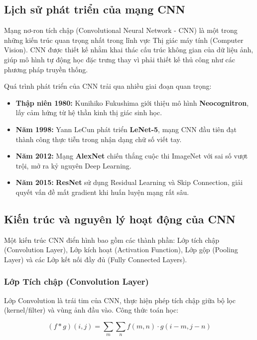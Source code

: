 \subsection{Lịch sử phát triển của mạng CNN}
Mạng nơ-ron tích chập (Convolutional Neural Network - CNN) là một trong những kiến trúc quan trọng nhất trong lĩnh vực Thị giác máy tính (Computer Vision). CNN được thiết kế nhằm khai thác cấu trúc không gian của dữ liệu ảnh, giúp mô hình tự động học đặc trưng thay vì phải thiết kế thủ công như các phương pháp truyền thống.

Quá trình phát triển của CNN trải qua nhiều giai đoạn quan trọng:

\begin{itemize}
    \item \textbf{Thập niên 1980:} Kunihiko Fukushima giới thiệu mô hình \textbf{Neocognitron}, lấy cảm hứng từ hệ thần kinh thị giác sinh học.
    \item \textbf{Năm 1998:} Yann LeCun phát triển \textbf{LeNet-5}, mạng CNN đầu tiên đạt thành công thực tiễn trong nhận dạng chữ số viết tay.
    \item \textbf{Năm 2012:} Mạng \textbf{AlexNet} chiến thắng cuộc thi ImageNet với sai số vượt trội, mở ra kỷ nguyên Deep Learning.
    \item \textbf{Năm 2015:} \textbf{ResNet} sử dụng Residual Learning và Skip Connection, giải quyết vấn đề mất gradient khi huấn luyện mạng rất sâu.
\end{itemize}

\subsection{Kiến trúc và nguyên lý hoạt động của CNN}
Một kiến trúc CNN điển hình bao gồm các thành phần: Lớp tích chập (Convolution Layer), Lớp kích hoạt (Activation Function), Lớp gộp (Pooling Layer) và các Lớp kết nối đầy đủ (Fully Connected Layers).

\subsubsection{Lớp Tích chập (Convolution Layer)}
Lớp Convolution là trái tim của CNN, thực hiện phép tích chập giữa bộ lọc (kernel/filter) và vùng ảnh đầu vào. Công thức toán học:

\begin{equation}
    (f * g)(i,j) = \sum_{m} \sum_{n} f(m,n) \cdot g(i-m, j-n)
\end{equation}

